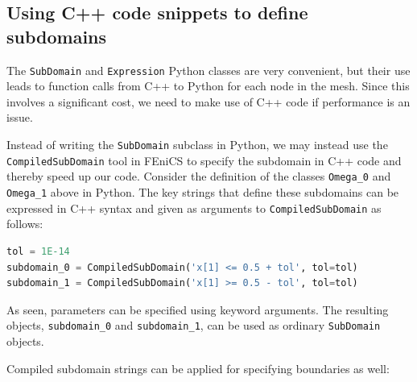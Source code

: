 \documentclass[graybox,envcountchap,sectrefs,final]{svmonodo}
\begin{document}

%
%
%

\subsection{Using C++ code snippets to define subdomains}

The \texttt{SubDomain} and \texttt{Expression} Python classes are very convenient,
but their use leads to function calls from C++ to Python for each node
in the mesh. Since this involves a significant cost, we need to make
use of C++ code if performance is an issue.

Instead of writing the \texttt{SubDomain} subclass in Python, we may instead use
the \texttt{CompiledSubDomain} tool in FEniCS to specify the subdomain in C++
code and thereby speed up our code. Consider
the definition of the classes \Verb!Omega_0! and \Verb!Omega_1! above in Python. The
key strings that define these subdomains can be expressed in C++ syntax
and given as arguments to \texttt{CompiledSubDomain} as follows:

\begin{lstlisting}[language=Python,style=graycolor]
tol = 1E-14
subdomain_0 = CompiledSubDomain('x[1] <= 0.5 + tol', tol=tol)
subdomain_1 = CompiledSubDomain('x[1] >= 0.5 - tol', tol=tol)
\end{lstlisting}
As seen, parameters can be specified using keyword arguments.
The resulting objects, \Verb!subdomain_0! and \Verb!subdomain_1!, can be used
as ordinary \texttt{SubDomain} objects.

Compiled subdomain strings can be applied for specifying boundaries as
well:
\end{document}
